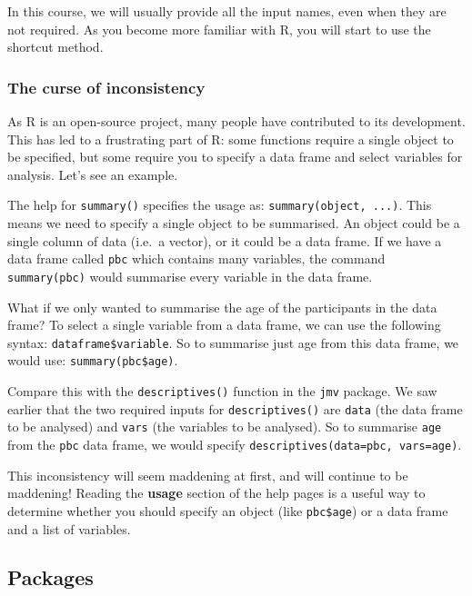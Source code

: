 \documentclass[
]{memoir}
\begin{document}
In this course, we will usually provide all the input names, even when they are not required. As you become more familiar with R, you will start to use the shortcut method.

\hypertarget{the-curse-of-inconsistency}{%
\subsubsection{The curse of inconsistency}\label{the-curse-of-inconsistency}}

As R is an open-source project, many people have contributed to its development. This has led to a frustrating part of R: some functions require a single object to be specified, but some require you to specify a data frame and select variables for analysis. Let's see an example.

The help for \texttt{summary()} specifies the usage as: \texttt{summary(object,\ ...)}. This means we need to specify a single object to be summarised. An object could be a single column of data (i.e.~a vector), or it could be a data frame. If we have a data frame called \texttt{pbc} which contains many variables, the command \texttt{summary(pbc)} would summarise every variable in the data frame.

What if we only wanted to summarise the age of the participants in the data frame? To select a single variable from a data frame, we can use the following syntax: \texttt{dataframe\$variable}. So to summarise just age from this data frame, we would use: \texttt{summary(pbc\$age)}.

Compare this with the \texttt{descriptives()} function in the \texttt{jmv} package. We saw earlier that the two required inputs for \texttt{descriptives()} are \texttt{data} (the data frame to be analysed) and \texttt{vars} (the variables to be analysed). So to summarise \texttt{age} from the \texttt{pbc} data frame, we would specify \texttt{descriptives(data=pbc,\ vars=age)}.

This inconsistency will seem maddening at first, and will continue to be maddening! Reading the \textbf{usage} section of the help pages is a useful way to determine whether you should specify an object (like \texttt{pbc\$age}) or a data frame and a list of variables.

\hypertarget{packages}{%
\subsection{Packages}\label{packages}}
\end{document}
